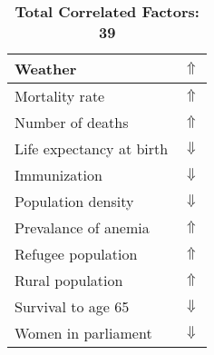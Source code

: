 \documentclass[12pt,notitlepage,oneside]{report}
\begin{document}
\begin{table}[!htb]
\begin{tabular}{|l|l|}
Weather & $\Uparrow$\\ \hline
Mortality rate & $\Uparrow$\\ \hline
Number of deaths & $\Uparrow$\\ \hline
Life expectancy at birth & $\Downarrow$\\ \hline
Immunization & $\Downarrow$\\ \hline
Population density & $\Downarrow$\\ \hline
Prevalance of anemia & $\Uparrow$\\ \hline
Refugee population & $\Uparrow$\\ \hline
Rural population & $\Uparrow$\\ \hline
Survival to age 65 & $\Downarrow$\\ \hline
Women in parliament & $\Downarrow$\\ \hline
\end{tabular}
\caption*{\textbf{Total Correlated Factors: 39}}
\end{table}
\clearpage
\end{document}
